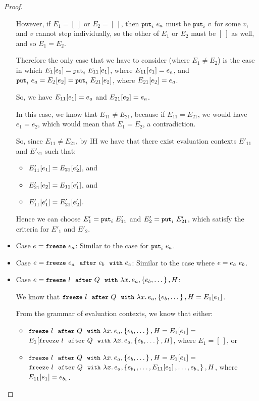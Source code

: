 \begin{proof}
\begin{itemize}
    However, if $E_1 = [~]$ or $E_2 = [~]$, then $\mbox{\small{\texttt{put}}}_i~e_a$ must
    be $\mbox{\small{\texttt{put}}}_i~v$ for some $v$, and $v$ cannot step individually,
    so the other of $E_1$ or $E_2$ must be $[~]$ as well, and so $E_1
    = E_2$.

    Therefore the only case that we have to consider (where $E_1 \neq
    E_2$) is the case in which $E_1\hspace{-0.5mm}\left[e_1\right] =
    \mbox{\small{\texttt{put}}}_i~E_{11}\hspace{-0.5mm}\left[e_1\right]$, where $E_{11}\hspace{-0.5mm}\left[e_1\right] =
    e_a$, and $\mbox{\small{\texttt{put}}}_i~e_a = E_2\hspace{-0.5mm}\left[e_2\right] =
    \mbox{\small{\texttt{put}}}_i~E_{21}\hspace{-0.5mm}\left[e_2\right]$, where $E_{21}\hspace{-0.5mm}\left[e_2\right] =
    e_a$.

    So, we have $E_{11}\hspace{-0.5mm}\left[e_1\right] = e_a$ and
    $E_{21}\hspace{-0.5mm}\left[e_2\right] = e_a$.

    In this case, we know that $E_{11} \neq E_{21}$, because if
    $E_{11} = E_{21}$, we would have $e_1 = e_2$, which would mean
    that $E_1 = E_2$, a contradiction.

    So, since $E_{11} \neq E_{21}$, by IH we have that there exist
    evaluation contexts $E'_{11}$ and $E'_{21}$ such that:
    \begin{itemize}
    \item $E'_{11}\hspace{-0.5mm}\left[e_1\right] = E_{21}\hspace{-0.5mm}\left[e'_2\right]$, and
    \item $E'_{21}\hspace{-0.5mm}\left[e_2\right] = E_{11}\hspace{-0.5mm}\left[e'_1\right]$, and
    \item $E'_{11}\hspace{-0.5mm}\left[e'_1\right] = E'_{21}\hspace{-0.5mm}\left[e'_2\right]$.
    \end{itemize}

    Hence we can choose $E'_1 = \mbox{\small{\texttt{put}}}_i~E'_{11}$ and $E'_2 =
    \mbox{\small{\texttt{put}}}_i~E'_{21}$, which satisfy the criteria for $E'_1$ and
    $E'_2$.

  \item Case $e = \mbox{\small{\texttt{freeze}}}~e_a$: Similar to the case for
    $\mbox{\small{\texttt{put}}}_i~e_a$.

  \item Case $e = \mbox{\small{\texttt{freeze}}}~e_a~~{\mbox{\small{\texttt{after}}}}~e_b~~{\mbox{\small{\texttt{with}}}}~e_c$: Similar to the case
    where $e = e_a~e_b$.

  \item Case $e = \mbox{\small{\texttt{freeze}}}~l~~{\mbox{\small{\texttt{after}}}}~Q~~{\mbox{\small{\texttt{with}}}}~\lambda x.\,e_a, \left\{e_b,
      \dots\right\}, H$:

    We know that $\mbox{\small{\texttt{freeze}}}~l~~{\mbox{\small{\texttt{after}}}}~Q~~{\mbox{\small{\texttt{with}}}}~\lambda x.\,e_a, \left\{e_b,
        \dots\right\}, H = E_1\hspace{-0.5mm}\left[e_1\right]$.

    From the grammar of evaluation contexts, we know that either:
    \begin{itemize}
    \item $\mbox{\small{\texttt{freeze}}}~l~~{\mbox{\small{\texttt{after}}}}~Q~~{\mbox{\small{\texttt{with}}}}~\lambda x.\,e_a, \left\{e_b,
        \dots\right\}, H = E_1\hspace{-0.5mm}\left[e_1\right] =$ \\
      $E_1\hspace{-0.5mm}\left[\mbox{\small{\texttt{freeze}}}~l~~{\mbox{\small{\texttt{after}}}}~Q~~{\mbox{\small{\texttt{with}}}}~\lambda x.\,e_a, \left\{e_b,
          \dots\right\}, H\right]$, where $E_1 = [~]$, or
    \item $\mbox{\small{\texttt{freeze}}}~l~~{\mbox{\small{\texttt{after}}}}~Q~~{\mbox{\small{\texttt{with}}}}~\lambda x.\,e_a, \left\{e_b,
        \dots\right\}, H = E_1\hspace{-0.5mm}\left[e_1\right] =$ \\
      $\mbox{\small{\texttt{freeze}}}~l~~{\mbox{\small{\texttt{after}}}}~Q~~{\mbox{\small{\texttt{with}}}}~\lambda x.\,e_a, \left\{e_{b_1}, \dots,
        E_{11}\hspace{-0.5mm}\left[e_1\right], \dots, e_{b_n}\right\}, H$, where
      $E_{11}\hspace{-0.5mm}\left[e_1\right] = e_{b_i}$.
    \end{itemize}


\end{itemize}
\end{proof}
